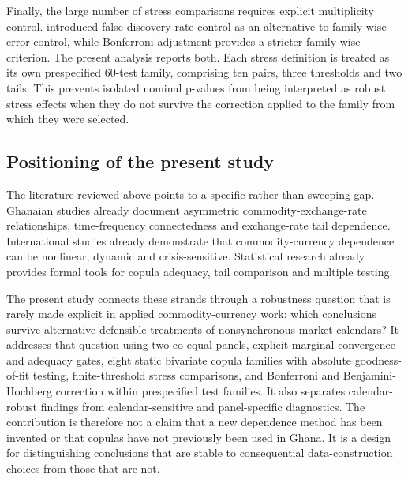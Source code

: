 Finally, the large number of stress comparisons requires explicit multiplicity control. \citet{benjamini1995} introduced false-discovery-rate control as an alternative to family-wise error control, while Bonferroni adjustment provides a stricter family-wise criterion. The present analysis reports both. Each stress definition is treated as its own prespecified 60-test family, comprising ten pairs, three thresholds and two tails. This prevents isolated nominal p-values from being interpreted as robust stress effects when they do not survive the correction applied to the family from which they were selected.

\subsection{Positioning of the present study}

The literature reviewed above points to a specific rather than sweeping gap. Ghanaian studies already document asymmetric commodity-exchange-rate relationships, time-frequency connectedness and exchange-rate tail dependence. International studies already demonstrate that commodity-currency dependence can be nonlinear, dynamic and crisis-sensitive. Statistical research already provides formal tools for copula adequacy, tail comparison and multiple testing.

The present study connects these strands through a robustness question that is rarely made explicit in applied commodity-currency work: which conclusions survive alternative defensible treatments of nonsynchronous market calendars? It addresses that question using two co-equal panels, explicit marginal convergence and adequacy gates, eight static bivariate copula families with absolute goodness-of-fit testing, finite-threshold stress comparisons, and Bonferroni and Benjamini-Hochberg correction within prespecified test families. It also separates calendar-robust findings from calendar-sensitive and panel-specific diagnostics. The contribution is therefore not a claim that a new dependence method has been invented or that copulas have not previously been used in Ghana. It is a design for distinguishing conclusions that are stable to consequential data-construction choices from those that are not.

